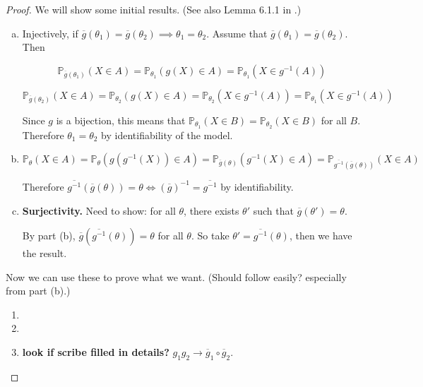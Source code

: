 \begin{proof} We will show some initial results. (See also Lemma 6.1.1 in \citet{lehmann2005testing}.)

\begin{enumerate}[(a)] 

\item Injectively, if \(\overline{g}(\theta_1) = \overline{g}(\theta_2) \implies \theta_1 = \theta_2\). Assume that \(\overline{g}(\theta_1) = \overline{g}(\theta_2)\). Then

\[
\mathbb{P}_{\overline{g}(\theta_1)} (X \in A) = \mathbb{P}_{\theta_1}(g(X) \in A) = \mathbb{P}_{\theta_1}(X \in g^{-1}(A)) 
\]

\[
\mathbb{P}_{\overline{g}(\theta_2)}(X \in A) = \mathbb{P}_{\theta_2}(g(X) \in A) = \mathbb{P}_{\theta_2}(X \in g^{-1}(A)) = \mathbb{P}_{\theta_1}(X \in g^{-1}(A)) 
\]

Since \(g\) is a bijection, this means that \(\mathbb{P}_{\theta_1}(X \in B) = \mathbb{P}_{\theta_2}(X \in B) \) for all \(B\). Therefore \(\theta_1 = \theta_2\) by identifiability of the model.

\item 

\[
\mathbb{P}_\theta(X \in A) = \mathbb{P}_\theta (g(g^{-1}(X)) \in A) = \mathbb{P}_{\overline{g}(\theta)} (g^{-1}(X) \in A) = \mathbb{P}_{\overline{g^{-1}}(\overline{g}(\theta))} (X \in A)
\]

Therefore \(\overline{g^{-1}}(\overline{g}(\theta)) = \theta \iff (\overline{g})^{-1} = \overline{g^{-1}}\) by identifiability.

\item \textbf{Surjectivity.} Need to show: for all \(\theta\), there exists \(\theta'\) such that \(\overline{g}(\theta') = \theta\). 

By part (b), \(\overline{g}(\overline{g^{-1}}(\theta)) = \theta\) for all \(\theta\). So take \(\theta' = \overline{g^{-1}}(\theta)\), then we have the result.

\end{enumerate}

Now we can use these to prove what we want. (Should follow easily? especially from part (b).) 

\begin{enumerate}

\item

\item

\item \textbf{look if scribe filled in details?} \(g_1 g_2 \to \overline{g}_1 \circ \overline{g}_2\). 

\end{enumerate}

\end{proof}

